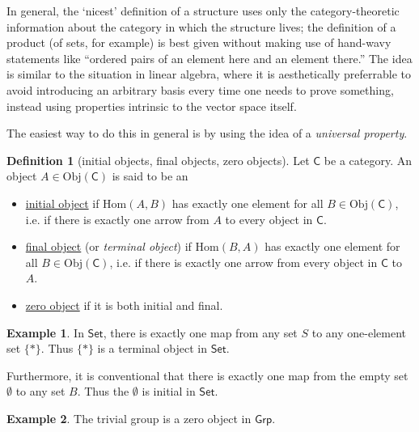 \documentclass[a4paper,10pt]{scrreprt}
\newcommand{\defn}[1]{\ul{#1}}
\newcommand{\Obj}{\mathrm{Obj}}
\newcommand{\Hom}{\mathrm{Hom}}
\theoremstyle{definition}
\newtheorem{definition}{Definition}[section]
\newtheorem{example}{Example}[section]
\theoremstyle{plain}
\theoremstyle{remark}
\begin{document}
In general, the `nicest' definition of a structure uses only the category-theoretic information about the category in which the structure lives; the definition of a product (of sets, for example) is best given without making use of hand-wavy statements like ``ordered pairs of an element here and an element there.'' The idea is similar to the situation in linear algebra, where it is aesthetically preferrable to avoid introducing an arbitrary basis every time one needs to prove something, instead using properties intrinsic to the vector space itself.

The easiest way to do this in general is by using the idea of a \emph{universal property}.

\begin{definition}[initial objects, final objects, zero objects]
  Let $\mathsf{C}$ be a category. An object $A \in \Obj(\mathsf{C})$ is said to be an
  \begin{itemize}
    \item \defn{initial object} if $\Hom(A,B)$ has exactly one element for all $B\in \Obj(\mathsf{C})$, i.e. if there is exactly one arrow from $A$ to every object in $\mathsf{C}$.

    \item \defn{final object} (or \emph{terminal object}) if $\Hom(B,A)$ has exactly one element for all $B\in \Obj(\mathsf{C})$, i.e. if there is exactly one arrow from every object in $\mathsf{C}$ to $A$.

    \item \defn{zero object} if it is both initial and final.
  \end{itemize}
  \label{def:initialfinalzeroobject}
\end{definition}

\begin{example}
  In $\mathsf{Set}$, there is exactly one map from any set $S$ to any one-element set $\{*\}$. Thus $\{*\}$ is a terminal object in $\mathsf{Set}$.

  Furthermore, it is conventional that there is exactly one map from the empty set $\emptyset$ to any set $B$. Thus the $\emptyset$ is initial in $\mathsf{Set}$.
\end{example}

\begin{example}
  The trivial group is a zero object in $\mathsf{Grp}$.
\end{example}
\end{document}
